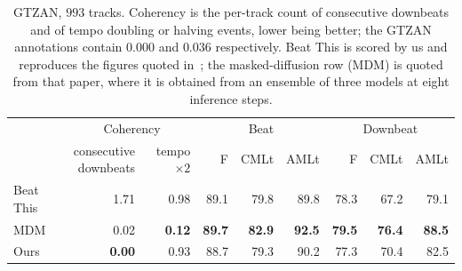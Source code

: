 \begin{table}[t]
  \centering
  \caption{GTZAN, $993$ tracks. Coherency is the per-track count of consecutive
  downbeats and of tempo doubling or halving events, lower being better; the GTZAN
  annotations contain $0.000$ and $0.036$ respectively. Beat This is scored
  by us and reproduces the figures quoted in~\cite{foscarin2026masked}; the
  masked-diffusion row (MDM) is quoted from that paper, where it is obtained
  from an ensemble of three models at eight inference steps.}
  \label{tab:gtzan}
  \footnotesize
  \setlength{\tabcolsep}{3pt}
  \begin{tabular}{@{}l rr rrr rrr@{}}
    \hline
    & \multicolumn{2}{c}{Coherency} & \multicolumn{3}{c}{Beat} & \multicolumn{3}{c}{Downbeat} \\
    \cline{2-3}\cline{4-6}\cline{7-9}
    & \makecell{consecutive\\downbeats} & \makecell{tempo\\$\times2$} & F & CMLt & AMLt & F & CMLt & AMLt \\
    \hline
    Beat This~\cite{foscarin2024beat} & 1.71 & 0.98 & 89.1 & 79.8 & 89.8 & 78.3 & 67.2 & 79.1 \\
    MDM~\cite{foscarin2026masked} & 0.02 & \textbf{0.12} & \textbf{89.7} & \textbf{82.9} & \textbf{92.5} & \textbf{79.5} & \textbf{76.4} & \textbf{88.5} \\
    Ours & \textbf{0.00} & 0.93 & 88.7 & 79.3 & 90.2 & 77.3 & 70.4 & 82.5 \\
    \hline
  \end{tabular}
\end{table}
